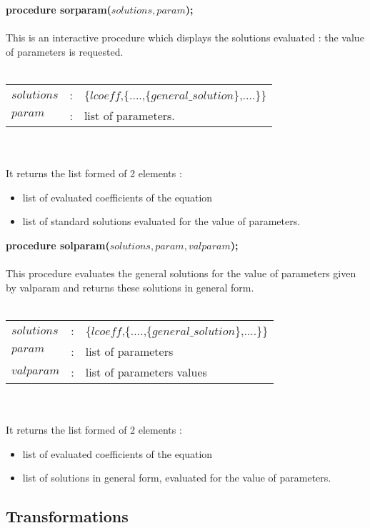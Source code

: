 \documentclass[a4paper]{article}
\begin{document}
{\bf procedure sorparam($solutions,param$);} \\
\ \\
This is an interactive procedure which displays the solutions evaluated :
the value of parameters is requested. \\
\ \\
\begin{tabular}{lcl}
$solutions$ & : & \{$lcoeff$,\{....,\{$general\_solution$\},....\}\} \\
$param$ & : & list of parameters. \\
\end{tabular} \\
\ \\
It returns the list formed of 2 elements :
\begin{itemize}
\item list of evaluated coefficients of the equation
\item list of standard solutions evaluated for the value of parameters.
\end{itemize}

{\bf procedure solparam($solutions,param,valparam$);} \\
\ \\
This procedure evaluates the general solutions for the value of parameters
given by valparam and returns these solutions in general form. \\
\ \\
\begin{tabular}{lcl}
$solutions$ & : & \{$lcoeff$,\{....,\{$general\_solution$\},....\}\} \\
$param$ & : & list of parameters \\
$valparam$ & : & list of parameters values \\
\end{tabular} \\
\ \\
It returns the list formed of 2 elements :
\begin{itemize}
\item list of evaluated coefficients of the equation 
\item list of solutions in general form, evaluated for the value of parameters.
\end{itemize}

\subsection{Transformations}
\end{document}
